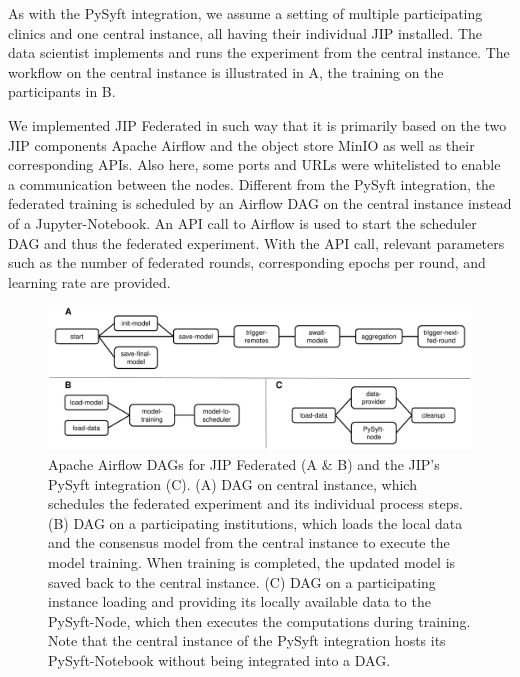 As with the PySyft integration, we assume a setting of multiple participating clinics and one central instance, all having their individual JIP installed. The data scientist implements and runs the experiment from the central instance.
The workflow on the central instance is illustrated in  A, the training on the participants in  B.

We implemented JIP Federated in such way that it is primarily based on the two JIP components Apache Airflow and the object store MinIO as well as their corresponding APIs. Also here, some ports and URLs were whitelisted to enable a communication between the nodes. Different from the PySyft integration, the federated training is scheduled by an Airflow DAG on the central instance instead of a Jupyter-Notebook. An API call to Airflow is used to start the scheduler DAG and thus the federated experiment. With the API call, relevant parameters such as the number of federated rounds, corresponding epochs per round, and learning rate are provided.

\begin{figure}[htbp]
    \centerline{\includegraphics[width=1\textwidth]{1_Figures/dags.pdf}}
    \caption[Airflow DAGs for JIP Federated and the JIP's PySyft integration]{Apache Airflow DAGs for JIP Federated (A \& B) and the JIP's PySyft integration (C). (A) DAG on central instance, which schedules the federated experiment and its individual process steps. (B) DAG on a participating institutions, which loads the local data and the consensus model from the central instance to execute the model training. When training is completed, the updated model is saved back to the central instance.  (C) DAG on a participating instance loading and providing its locally available data to the PySyft-Node, which then executes the computations during training. Note that the central instance of the PySyft integration hosts its PySyft-Notebook without being integrated into a DAG.}
\label{fig:Dags}
\end{figure}

